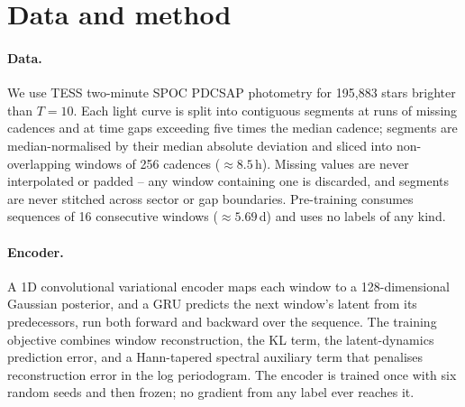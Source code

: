 \documentclass{article}
\begin{document}
\section{Data and method}

\paragraph{Data.} We use TESS two-minute SPOC PDCSAP photometry for 195{,}883 stars brighter than
$T = 10$. Each light curve is split into contiguous segments at runs of missing cadences and at time
gaps exceeding five times the median cadence; segments are median-normalised by their median absolute
deviation and sliced into non-overlapping windows of 256 cadences ($\approx 8.5$\,h). Missing values
are never interpolated or padded -- any window containing one is discarded, and segments are never
stitched across sector or gap boundaries. Pre-training consumes sequences of 16 consecutive windows
($\approx 5.69$\,d) and uses no labels of any kind.

\paragraph{Encoder.} A 1D convolutional variational encoder \citep{kingma2014} maps each window to a
128-dimensional Gaussian posterior, and a GRU \citep{cho2014} predicts the next window's latent from
its predecessors, run both forward and backward over the sequence. The training objective combines
window reconstruction, the KL term, the latent-dynamics prediction error, and a Hann-tapered spectral
auxiliary term that penalises reconstruction error in the log periodogram. The encoder is trained
once with six random seeds and then frozen; no gradient from any label ever reaches it.
\end{document}
